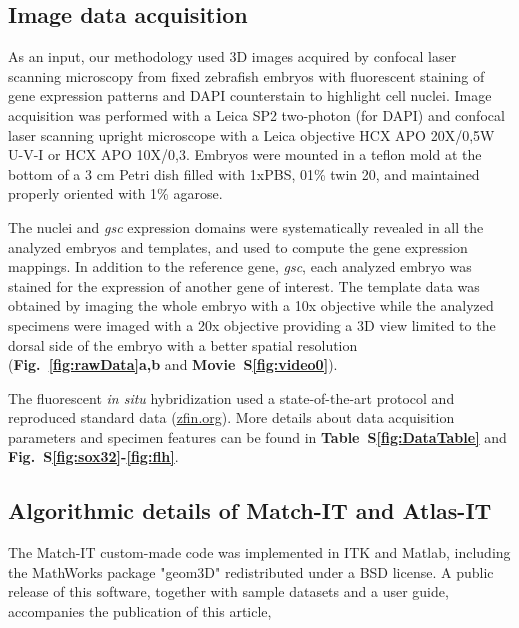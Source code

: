 \subsection*{Image data acquisition}

\label{subsec:ImageData}



As an input, our methodology used 3D images acquired by confocal laser scanning microscopy from fixed zebrafish embryos with fluorescent staining of gene expression patterns and DAPI counterstain to highlight cell nuclei. Image acquisition was performed with a Leica SP2 two-photon (for DAPI) and confocal laser scanning upright microscope with a Leica objective HCX APO 20X/0,5W U-V-I or HCX APO 10X/0,3. Embryos were mounted in a teflon mold at the bottom of a 3 cm Petri dish filled with 1xPBS, 01\% twin 20, and maintained properly oriented with 1\% agarose.



The nuclei and \emph{gsc} expression domains were systematically revealed in all the analyzed embryos and templates, and used to compute the gene expression mappings. In addition to the reference gene, \emph{gsc}, each analyzed embryo was stained for the expression of another gene of interest. The template data was obtained by imaging the whole embryo with a 10x objective while the analyzed specimens were imaged with a 20x objective providing a 3D view limited to the dorsal side of the embryo with a better spatial resolution (\textbf{Fig.~\ref{fig:rawData}a,b} and \textbf{Movie~S\ref{fig:video0}}).



The fluorescent \emph{in situ} hybridization used a state-of-the-art protocol\cite{brend2009zebrafish} and reproduced standard data (\href{zfin.org}{zfin.org}). More details about data acquisition parameters and specimen features can be found in \textbf{Table~S\ref{fig:DataTable}} and \textbf{Fig.~S\ref{fig:sox32}-\ref{fig:flh}}.



\subsection*{Algorithmic details of Match-IT and Atlas-IT}

\label{sec:MatchIT_details}



The Match-IT custom-made code was implemented in ITK and Matlab, including the MathWorks package "geom3D" redistributed under a BSD license. A public release of this software, together with sample datasets and a user guide, accompanies the publication of this article,

